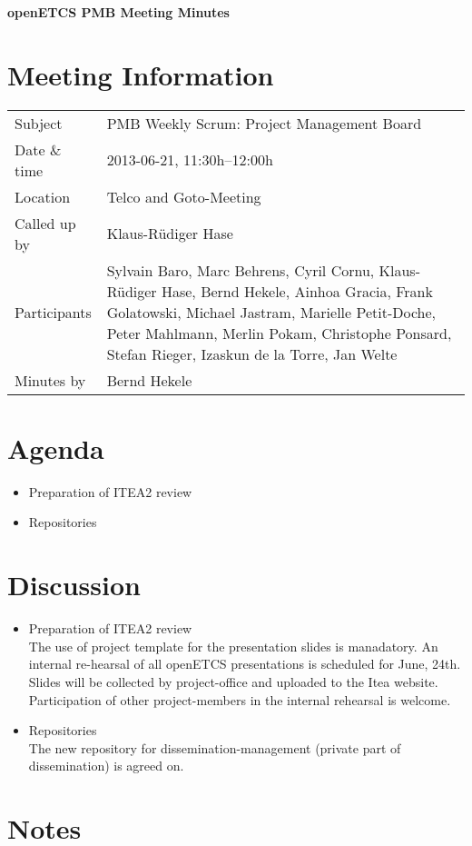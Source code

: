 \documentclass[a4paper, 11pt]{article}
\begin{document}
{\begin{center}\huge\bf openETCS PMB Meeting Minutes\end{center}}
\section{Meeting Information}

\renewcommand{\arraystretch}{1.5}
\begin{supertabular}{m{.2\textwidth}m{.8\textwidth}}
Subject & PMB Weekly Scrum: Project Management Board\\
Date \& time & 2013-06-21, 11:30h--12:00h\\
Location & Telco and Goto-Meeting\\
Called up by & Klaus-R\"udiger Hase\\
Participants &
Sylvain Baro,
Marc Behrens,
Cyril Cornu,
Klaus-R\"udiger Hase,
Bernd Hekele,
Ainhoa Gracia,
Frank Golatowski,
Michael Jastram,
Marielle Petit-Doche,
Peter Mahlmann,
Merlin Pokam,
Christophe Ponsard,
Stefan Rieger,
Izaskun de la Torre,
Jan Welte
\\

Minutes by & Bernd Hekele\\

\end{supertabular}
\renewcommand{\arraystretch}{1.0}


\section{{Agenda}}
\begin{itemize}
\item Preparation of ITEA2 review
\item Repositories
\end{itemize}

\section{Discussion}
\begin{itemize}
\item Preparation of ITEA2 review\\
The use of project template for the presentation slides is manadatory. An internal re-hearsal of all openETCS presentations is scheduled for June, 24th. Slides will be collected by project-office and uploaded to the Itea website. Participation of other project-members in the internal rehearsal is welcome.


\item Repositories\\
The new repository for dissemination-management (private part of dissemination) is agreed on.
\end{itemize}

\section{Notes}
\end{document}
